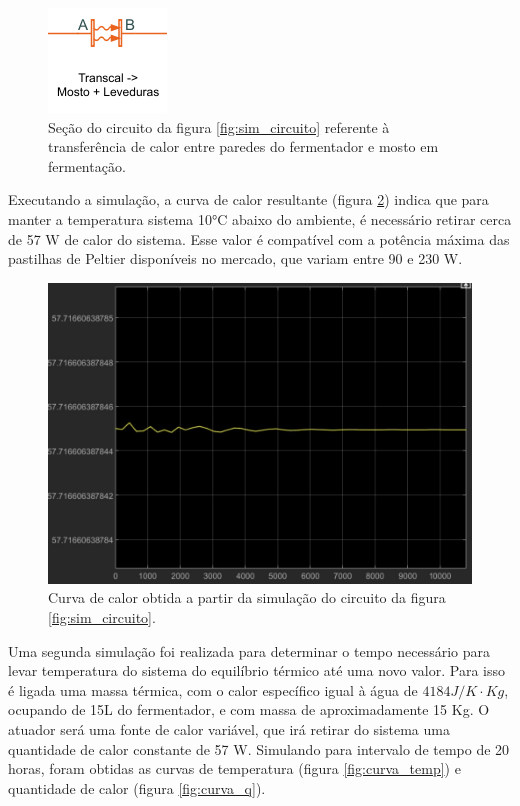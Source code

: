 \begin{figure}[H]
    \centering
    \includegraphics[scale=0.8]{figuras/projeto/controle/transcal_mosto.png}
    \caption{Seção do circuito da figura \ref{fig:sim_circuito} referente à transferência de calor entre paredes do fermentador e mosto em fermentação.}
    \label{fig:transcal_mosto}
\end{figure}


Executando a simulação, a curva de calor resultante (figura \ref{fig:curva_calor}) indica que para manter a temperatura sistema 10°C abaixo do ambiente, é necessário retirar cerca de 57 W de calor do sistema. Esse valor é compatível com a potência máxima das pastilhas de Peltier disponíveis no mercado, que variam entre 90 e 230 W.

\begin{figure}[h]
    \centering
    \includegraphics[scale=0.30]{figuras/projeto/controle/curva_calor.jpg}
    \caption{Curva de calor obtida a partir da simulação do circuito da figura \ref{fig:sim_circuito}.}
    \label{fig:curva_calor}
\end{figure}


Uma segunda simulação foi realizada para determinar o tempo necessário para levar temperatura do sistema do  equilíbrio térmico até uma novo valor. Para isso é ligada uma massa térmica, com o calor específico igual à água de \( 4184 J/K \cdot Kg \), ocupando de 15L do fermentador, e com massa de aproximadamente 15 Kg. O atuador será uma fonte de calor variável, que irá retirar do sistema uma quantidade de calor constante de 57 W. Simulando para intervalo de tempo de 20 horas, foram obtidas as curvas de temperatura (figura \ref{fig:curva_temp}) e quantidade de calor (figura \ref{fig:curva_q}).



